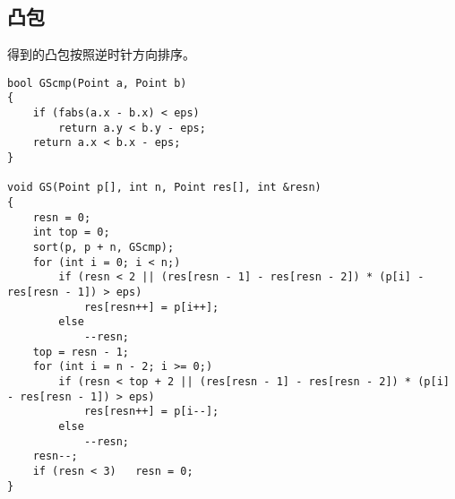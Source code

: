 \subsection{凸包}
    得到的凸包按照逆时针方向排序。
\begin{verbatim}
bool GScmp(Point a, Point b)
{
    if (fabs(a.x - b.x) < eps)
        return a.y < b.y - eps;
    return a.x < b.x - eps;
}

void GS(Point p[], int n, Point res[], int &resn)
{
    resn = 0;
    int top = 0;
    sort(p, p + n, GScmp);
    for (int i = 0; i < n;)
        if (resn < 2 || (res[resn - 1] - res[resn - 2]) * (p[i] - res[resn - 1]) > eps)
            res[resn++] = p[i++];
        else
            --resn;
    top = resn - 1;
    for (int i = n - 2; i >= 0;)
        if (resn < top + 2 || (res[resn - 1] - res[resn - 2]) * (p[i] - res[resn - 1]) > eps)
            res[resn++] = p[i--];
        else
            --resn;
    resn--;
    if (resn < 3)   resn = 0;
}
\end{verbatim}

